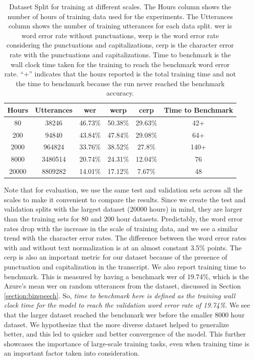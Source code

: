 \begin{table}[ht]
\centering
\begin{tabular}{c c c c c c}
\hline
  Hours & Utterances & \acrshort{wer} & \acrshort{werp} & \acrshort{cerp} & Time to Benchmark\\
 \hline
  80 & 38246 & 46.73\% & 50.38\% & 29.63\% & 42+\\ 
  200 & 94840 & 43.84\% & 47.84\% & 29.08\% & 64+\\
  2000 & 964824 & 33.76\% & 38.52\% & 27.8\% & 140+\\
  8000 & 3480514 & 20.74\% & 24.31\% & 12.04\% & 76\\
  20000 & 8809282 & 14.01\% & 17.12\% & 7.67\% & 48\\
 \hline
\end{tabular}
\caption{\label{table:datascales}Dataset Split for training at different scales. The Hours column shows the number of hours of training data used for the experiments. The Utterances column shows the number of training utterances for each data split. \acrshort{wer} is word error rate without punctuations, \acrshort{werp} is the word error rate considering the punctuations and capitalizations, \acrshort{cerp} is the character error rate with the punctuations and capitalizations. Time to benchmark is the wall clock time taken for the training to reach the benchmark word error rate. ``+'' indicates that the hours reported is the total training time and not the time to benchmark because the run never reached the benchmark accuracy.}
\end{table}

Note that for evaluation, we use the same test and validation sets across all the scales to make it convenient to compare the results. Since we create the test and validation splits with the largest dataset (20000 hours) in mind, they are larger than the training sets for 80 and 200 hour datasets. Predictably, the word error rates drop with the increase in the scale of training data, and we see a similar trend with the character error rates. The difference between the word error rates with and without text normalization is at an almost constant 3.5\% points. The \acrshort{cerp} is also an important metric for our dataset because of the presence of punctuation and capitalization in the transcript. We also report training time to benchmark. This is measured by having a benchmark \acrshort{wer} of 19.74\%, which is the Azure's mean \acrshort{wer} on random utterances from the dataset, discussed in Section \ref{section:bizspeech}. So, \emph{time to benchmark here is defined as the training wall clock time for the model to reach the validation word error rate of 19.74\%}. We see that the larger dataset reached the benchmark \acrshort{wer} before the smaller 8000 hour dataset. We hypothesize that the more diverse dataset helped to generalize better, and this led to quicker and better convergence of the model. This further showcases the importance of large-scale training tasks, even when training time is an important factor taken into consideration.

